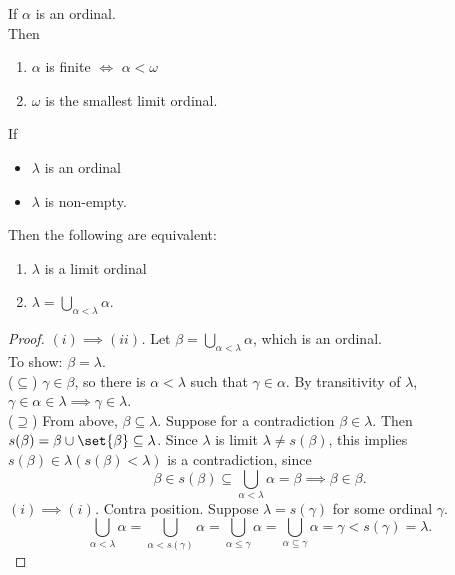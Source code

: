 \begin{exercise}
    If $\alpha$ is an ordinal.\\
    Then 
    \begin{enumerate}[label=(\roman*)]
        \item $\alpha$ is finite $\iff$ $\alpha < \omega$
        \item $\omega$ is the smallest limit ordinal.
    \end{enumerate}
\end{exercise}

\begin{proposition}
    If 
    \begin{itemize}
        \item $\lambda$ is an ordinal
        \item $\lambda$ is non-empty.
    \end{itemize}
    Then the following are equivalent:
    \begin{enumerate}[label=(\roman*)]
        \item $\lambda$ is a limit ordinal
        \item $\lambda = \bigcup\limits_{\alpha < \lambda} \alpha$.
    \end{enumerate}
\end{proposition}
\begin{proof}
    \emph{$(i) \implies (ii)$.} Let $\beta = \bigcup\limits_{\alpha < \lambda} \alpha$, which is an ordinal.\\
    To show: $\beta = \lambda.$\\
    ($\subseteq$) $\gamma \in \beta$, so there is $\alpha < \lambda$ such that $\gamma \in \alpha$. 
    By transitivity of $\lambda$, $\gamma \in \alpha \in \lambda \implies \gamma \in \lambda$.\\
    ($\supseteq$) From above, $\beta \subseteq \lambda$. Suppose for a contradiction $\beta \in \lambda$.
    Then $s(\beta) = \beta \cup \set{\beta} \subseteq \lambda$. Since $\lambda$ is limit $\lambda \ne s(\beta)$, 
    this implies $s(\beta) \in \lambda (s(\beta) < \lambda)$ is a contradiction, since 
    $$ \beta \in s(\beta) \subseteq \bigcup_{\alpha < \lambda} \alpha = \beta \implies \beta \in \beta. $$
    \emph{$(i) \implies (i)$.} Contra position. Suppose $\lambda = s(\gamma)$ for some ordinal $\gamma$.
    $$ \bigcup_{\alpha < \lambda} \alpha = \bigcup_{\alpha < s(\gamma)} \alpha = \bigcup_{\alpha \leq \gamma} \alpha
        = \bigcup_{\alpha \subseteq \gamma} \alpha = \gamma < s(\gamma) = \lambda.$$
\end{proof}

